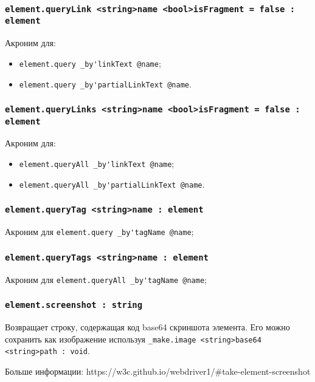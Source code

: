 \documentclass[a4paper, 14pt]{extarticle}
\newenvironment{icItems}
	{ \begin{itemize} [noitemsep,nolistsep] }
	{ \end{itemize} }
\begin{document}
\subsubsection{\lstinline|element.queryLink <string>name <bool>isFragment = false : element|}

Акроним для:
\begin{icItems}
	\item \lstinline|element.query _by'linkText @name|;
	\item \lstinline|element.query _by'partialLinkText @name|.
\end{icItems}

\subsubsection{\lstinline|element.queryLinks <string>name <bool>isFragment = false : element|}

Акроним для:
\begin{icItems}
	\item \lstinline|element.queryAll _by'linkText @name|;
	\item \lstinline|element.queryAll _by'partialLinkText @name|.
\end{icItems}

\subsubsection{\lstinline|element.queryTag <string>name : element|}

Акроним для \lstinline|element.query _by'tagName @name|;

\subsubsection{\lstinline|element.queryTags <string>name : element|}

Акроним для \lstinline|element.queryAll _by'tagName @name|;

\subsubsection{\lstinline|element.screenshot : string|}

Возвращает строку, содержащая код base64 скриншота элемента. Его можно сохранить как изображение используя \lstinline|_make.image <string>base64 <string>path : void|.

Больше информации: https://w3c.github.io/webdriver1/\#take-element-screenshot
\end{document}
